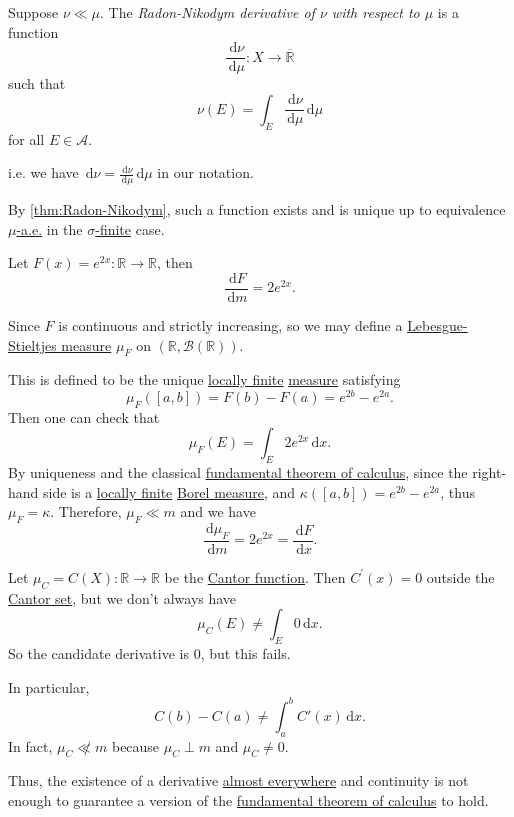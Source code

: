 \begin{definition}\label{def:Radon-Nikodym-derivative}
	Suppose \(\nu \ll \mu\). The \emph{Radon-Nikodym derivative of \(\nu\) with respect to \(\mu\)} is a function
	\[
		\frac{\,\mathrm{d} \nu}{\,\mathrm{d} \mu} \colon X \to \overline{\mathbb{R}}
	\]
	such that
	\[
		\nu(E) = \int_E \frac{\,\mathrm{d} \nu}{\,\mathrm{d} \mu} \,\mathrm{d} \mu
	\]
	for all \(E \in \mathcal{A}\).
\end{definition}

\begin{remark}
	i.e. we have \(\,\mathrm{d} \nu = \frac{\,\mathrm{d} \nu}{\,\mathrm{d} \mu} \,\mathrm{d} \mu\) in our notation.
\end{remark}

\begin{note}
	By \autoref{thm:Radon-Nikodym}, such a function exists and is unique up to equivalence \hyperref[def:mu-almost-everywhere]{\(\mu\)-a.e.} in the \hyperref[def:finite-signed-measure]{\(\sigma\)-finite} case.
\end{note}

\begin{eg}
	Let \(F(x) = e^{2x} \colon \mathbb{R} \to \mathbb{R}\), then
	\[
		\frac{\,\mathrm{d} F}{\,\mathrm{d} m} = 2e^{2x}.
	\]
\end{eg}
\begin{explanation}
	Since \(F\) is continuous and strictly increasing, so we may define a \hyperref[def:Lebesgue-Stieltjes-measure]{Lebesgue-Stieltjes measure}
	\(\mu_F\) on \((\mathbb{R}, \mathcal{B}(\mathbb{R}))\).

	This is defined to be the unique \hyperref[def:locally-finite]{locally finite} \hyperref[def:measure]{measure} satisfying
	\[
		\mu_F([a,b]) = F(b) - F(a) = e^{2b} - e^{2a}.
	\]
	Then one can check that
	\[
		\mu_F(E) = \int_E 2e^{2x} \,\mathrm{d} x.
	\]
	By uniqueness and the classical \underline{fundamental theorem of calculus}, since the right-hand side is a \hyperref[def:locally-finite]{locally finite} \hyperref[def:Borel-measure]{Borel measure}, and \(\kappa([a,b]) = e^{2b} - e^{2a}\), thus \(\mu_F = \kappa\). Therefore, \(\mu_F \ll m\) and we have
	\[
		\frac{\,\mathrm{d} \mu_F}{\,\mathrm{d} m} = 2e^{2x} = \frac{\,\mathrm{d} F}{\,\mathrm{d} x}.
	\]
\end{explanation}

\begin{eg}
	Let \(\mu _C = C(X) \colon \mathbb{R} \to \mathbb{R}\) be the \hyperref[sssec:Cantor-Function]{Cantor function}. Then \(C^\prime(x) = 0\)
	outside the \hyperref[eg:lec8:Cantor-set]{Cantor set}, but we don't always have
	\[
		\mu_C(E) \neq \int_E 0 \,\mathrm{d} x.
	\]
	So the candidate derivative is \(0\), but this fails.
\end{eg}
\begin{explanation}
	In particular,
	\[
		C(b) - C(a) \neq \int_a^b C'(x) \,\mathrm{d} x.
	\]
	In fact, \(\mu_C \not\ll m\) because \(\mu_C \perp m\) and \(\mu_C \neq 0\).

	Thus, the existence of a derivative \hyperref[def:mu-almost-everywhere]{almost everywhere} and continuity is not enough to guarantee a version of the \underline{fundamental theorem of calculus} to hold.
\end{explanation}